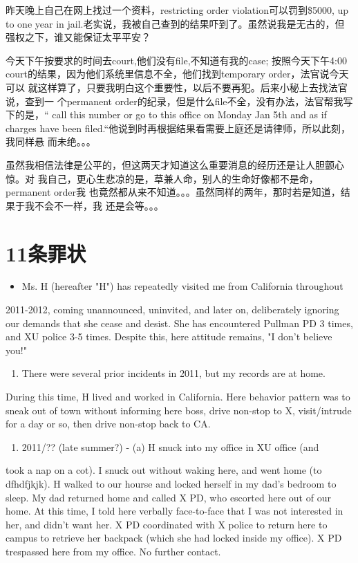 \documentclass[12pt]{book}
\begin{document}
昨天晚上自己在网上找过一个资料，restricting order violation可以罚到\$5000, up
to one year in jail.老实说，我被自己查到的结果吓到了。虽然说我是无古的，但
强权之下，谁又能保证太平平安？

今天下午按要求的时间去court,他们没有file,不知道有我的case; 按照今天下午4:00 
court的结果，因为他们系统里信息不全，他们找到temporary order，法官说今天可以
就这样算了，只要我明白这个重要性，以后不要再犯。后来小秘上去找法官说，查到一
个permanent order的纪录，但是什么file不全，没有办法，法官帮我写下的是，“
call this number or go to this office on Monday Jan 5th and as if charges 
have been filed.“他说到时再根据结果看需要上庭还是请律师，所以此刻，我同样悬
而未绝。。。

虽然我相信法律是公平的，但这两天才知道这么重要消息的经历还是让人胆颤心惊。对
我自己，更心生悲凉的是，草兼人命，别人的生命好像都不是命，permanent order我
也竟然都从来不知道。。。虽然同样的两年，那时若是知道，结果于我不会不一样，我
还是会等。。。

\chapter{11条罪状}
\label{sec-50}

\begin{itemize}
\item Ms. H (hereafter "H") has repeatedly visited me from California throughout
\end{itemize}
2011-2012, coming unannounced, uninvited, and later on, deliberately 
ignoring our demands that she cease and desist. She has encountered Pullman 
PD 3 times, and XU police 3-5 times. Despite this, here attitude remains, "I
don't believe you!"  

\begin{enumerate}
\item There were several prior incidents in 2011, but my records are at home.
\end{enumerate}
During this time, H lived and worked in California. Here behavior pattern 
was to sneak out of town without informing here boss, drive non-stop to X, 
visit/intrude for a day or so, then drive non-stop back to CA.

\begin{enumerate}
\item 2011/?? (late summer?) - (a) H snuck into my office in XU office (and
\end{enumerate}
took a nap on a cot). I snuck out without waking here, and went home (to 
dfhdfjkjk). H walked to our hourse and locked herself in my dad's bedroom to
sleep. My dad returned home and called X PD, who escorted here out of our 
home. At this time, I told here verbally face-to-face that I was not 
interested in her, and didn't want her. X PD coordinated with X police to 
return here to campus to retrieve her backpack (which she had locked inside 
my office). X PD trespassed here from my office. No further contact. 
\end{document}

